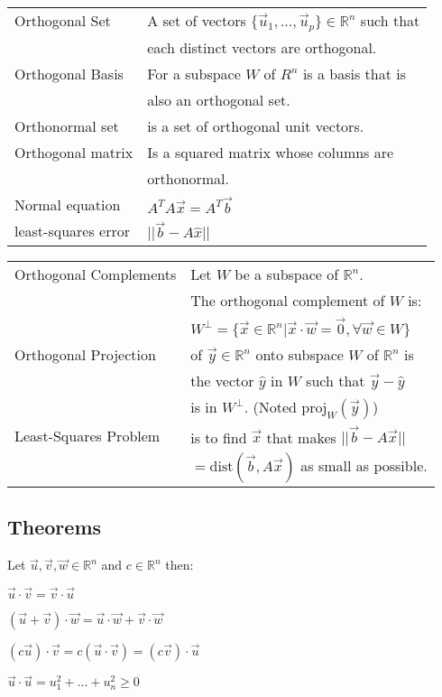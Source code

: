 \documentclass[5pt]{article}
\begin{document}
\begin{multicols}{2}
\begin{tabular}{ll}
Orthogonal Set        & A set  of vectors $\{\vec{u}_1, ..., \vec{u}_p\}\in\mathbb{R}^n$ such that\\ 
                      & each distinct vectors are orthogonal.\\
Orthogonal Basis      & For a subspace $W$ of $R^n$ is a basis that is\\
                      & also an orthogonal set.\\
Orthonormal set       & is a set  of  orthogonal unit vectors.\\
Orthogonal matrix     & Is a squared matrix whose columns are\\
                      & orthonormal.\\
Normal equation       & $A^TA\vec{x}=A^T\vec{b}$\\
least-squares error   & $||\vec{b}-A\hat{x}||$
\end{tabular}
\begin{tabular}{ll}
Orthogonal Complements  & Let $W$ be a subspace of $\mathbb{R}^n$.\\
                        & The orthogonal complement of $W$ is: \\
                        & $W^\perp=\{\vec{x}\in\mathbb{R}^n|\vec{x}\cdot\vec{w}=\vec{0}, \forall\vec{w}\in W\}$\\
Orthogonal Projection   & of $\vec{y}\in\mathbb{R}^n$ onto subspace $W$ of $\mathbb{R}^n$ is\\
                        & the vector $\hat{y}$ in $W$ such that $\vec{y} -\hat{y}$ \\
                        & is in $W^\perp$. (Noted $\text{proj}_W(\vec{y})$)\\
Least-Squares Problem   & is to find $\vec{x}$ that makes $||\vec{b}-A\vec{x}||$ \\
                        & $=\text{dist}(\vec{b},A\vec{x})$ as small as possible.                  
\end{tabular}

\subsection{Theorems}
\begin{properties}
  Let $\vec{u},\vec{v},\vec{w} \in \mathbb{R}^n$ and $c\in \mathbb{R}^n$ then:\\
  \begin{itemize*}
    \item $\vec{u}\cdot\vec{v}=\vec{v}\cdot\vec{u}$ 
    \item $(\vec{u}+\vec{v})\cdot \vec{w}=\vec{u}\cdot\vec{w}+\vec{v}\cdot \vec{w}$
    \item $(c\vec{u})\cdot \vec{v}=c(\vec{u}\cdot \vec{v})=(c\vec{v})\cdot \vec{u}$
    \item $\vec{u}\cdot \vec{u}=u_1^2+...+u^2_n\geq 0$
  \end{itemize*}
\end{properties}


\end{multicols}
\end{document}
